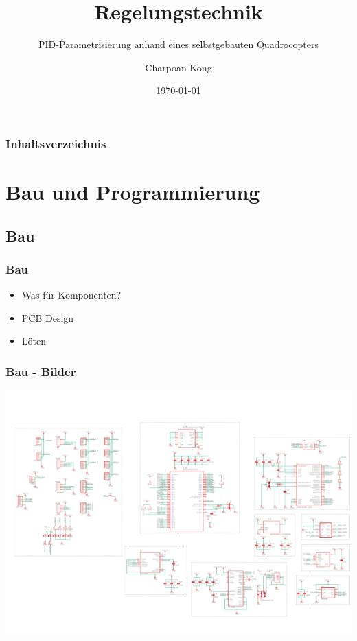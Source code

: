 \documentclass[12pt,a4paper, ngerman]{beamer}
\title{Regelungstechnik}
\subtitle{PID-Parametrisierung anhand eines selbstgebauten Quadrocopters}
\author{Charpoan Kong}
\institute{Kantonsschule Zürich Nord}
\date{\today}
\begin{document}
\begin{frame}
\titlepage
\end{frame}

\begin{frame}
\frametitle{Inhaltsverzeichnis}
\tableofcontents
\end{frame}

\section{Bau und Programmierung}
\subsection{Bau}
 
\begin{frame}
\frametitle{Bau}
\begin{itemize}
\item Was für Komponenten?
\item PCB Design
\item Löten
\end{itemize}
\end{frame}

\begin{frame}
\frametitle{Bau - Bilder}
\includegraphics[width=1\textwidth]{Schalti.pdf}
\end{frame}
\end{document}
